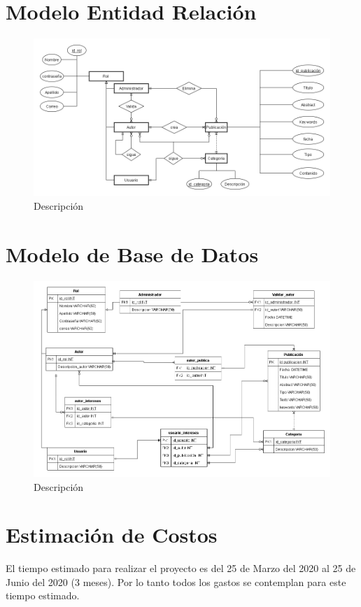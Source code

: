 \documentclass[a4paper,12 pt]{article}
\begin{document}
\begin{landscape}
\section{Modelo Entidad Relación}
    \begin{figure}[H]
        \centering
        \includegraphics[scale = 0.7]{images/ERD.png}
        \caption{Descripción}
        \label{F01}
    \end{figure}{}

\section{Modelo de Base de Datos}
    \begin{figure}[H]
        \centering
        \includegraphics[scale = 0.55]{images/Diagr_BD.png}
        \caption{Descripción}
        \label{F01}
    \end{figure}{}
\end{landscape}

\section{Estimación de Costos}
El tiempo estimado para realizar el proyecto es del 25 de Marzo del 2020 al 25 de Junio del 2020 (3 meses). Por lo tanto todos los gastos se contemplan para este tiempo estimado.\\
\end{document}
